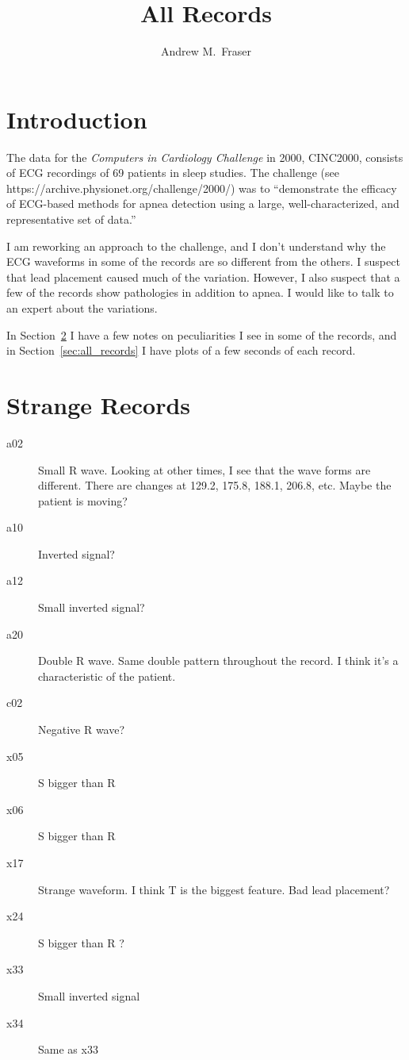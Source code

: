 \documentclass[12pt]{article}
\title{All Records}
\author{Andrew M.\ Fraser}
\begin{document}
\maketitle

\section{Introduction}
\label{sec:introduction}

The data for the \emph{Computers in Cardiology Challenge} in 2000,
CINC2000, consists of ECG recordings of 69 patients in sleep studies.
The challenge (see https://archive.physionet.org/challenge/2000/) was
to ``demonstrate the efficacy of ECG-based methods for apnea detection
using a large, well-characterized, and representative set of data.''

I am reworking an approach to the challenge, and I don't understand
why the ECG waveforms in some of the records are so different from the
others.  I suspect that lead placement caused much of the variation.
However, I also suspect that a few of the records show pathologies in
addition to apnea.  I would like to talk to an expert about the
variations.

In Section~\ref{sec:strange_records} I have a few notes on
peculiarities I see in some of the records, and in
Section~\ref{sec:all_records} I have plots of a few seconds of each
record.

\section{Strange Records}
\label{sec:strange_records}

\begin{description}
\item[a02] Small R wave.  Looking at other times, I see that the wave
  forms are different.  There are changes at 129.2, 175.8, 188.1,
  206.8, etc.  Maybe the patient is moving?
\item[a10] Inverted signal?
\item[a12] Small inverted signal?
\item[a20] Double R wave.  Same double pattern throughout the record.
  I think it's a characteristic of the patient.
\item[c02] Negative R wave?
\item[x05] S bigger than R
\item[x06] S bigger than R
\item[x17] Strange waveform.  I think T is the biggest feature.  Bad
  lead placement?
\item[x24] S bigger than R ?
\item[x33] Small inverted signal
\item[x34] Same as x33
\end{description}
\end{document}
